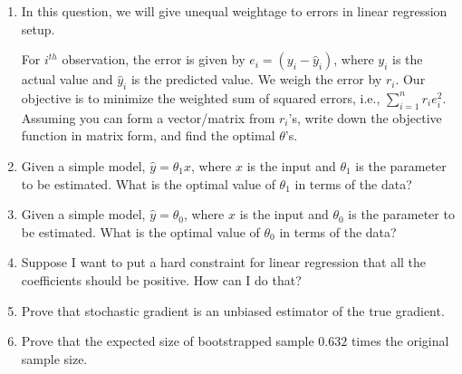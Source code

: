 \documentclass[12pt]{article}
\begin{document}
\begin{enumerate}
    \item In this question, we will give unequal weightage to errors in linear regression setup.

    \noindent For $i^{th}$ observation, the error is given by $e_i = (y_i - \hat{y}_i)$, where $y_i$ is the actual value and $\hat{y}_i$ is the predicted value.
    We weigh the error by $r_i$. Our objective is to minimize the weighted sum of squared errors, i.e., $\sum_{i=1}^{n} r_i e_i^2$.
    \\
    \noindent Assuming you can form a vector/matrix from $r_i$'s, write down the objective function in matrix form, and find the optimal $\theta$'s.

    \item Given a simple model, $\hat{y} = \theta_1 x$, where $x$ is the input and $\theta_1$ is the parameter to be estimated. What is the optimal value of $\theta_1$ in terms of the data?
    \item Given a simple model, $\hat{y} = \theta_0$, where $x$ is the input and $\theta_0$ is the parameter to be estimated. What is the optimal value of $\theta_0$ in terms of the data?
    \item Suppose I want to put a hard constraint for linear regression that all the coefficients should be positive. How can I do that?
    \item Prove that stochastic gradient is an unbiased estimator of the true gradient.
    \item Prove that the expected size of bootstrapped sample $0.632$ times the original sample size.
\end{enumerate}
\end{document}
